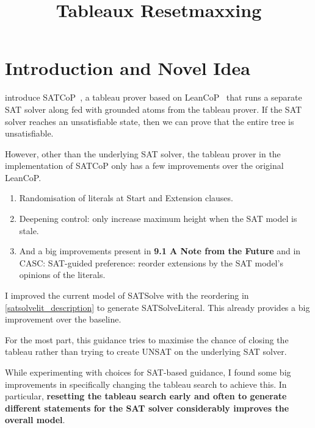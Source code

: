 \documentclass[11pt,twocolumn]{article}
\title{Tableaux Resetmaxxing}
\date{}
\author{}
\newcommand{\atom}[1]{\colorbox{Gray!30}{\ttfamily #1}}
\newcommand{\citen}[1]{~\parencite{#1}}
\begin{document}
\twocolumn[
	\centering
	\vspace{1em}
	{\LARGE\bfseries Tableau Resetmaxxing for Fun and Profit \par} \vspace{3pt}
	{\large (a crazy idea that works really well) \par}
	\vspace{2em}
]

\section{Introduction and Novel Idea}

\citeauthor{eliminatingModels} introduce SATCoP\citen{eliminatingModels}, a tableau prover based on LeanCoP\citen{Otten2023leanCoP20} that runs a separate SAT solver along fed with grounded atoms from the tableau prover.
If the SAT solver reaches an unsatisfiable state, then we can prove that the entire tree is unsatisfiable.

However, other than the underlying SAT solver, the tableau prover in the implementation of SATCoP only has a few improvements over the original LeanCoP.
\begin{enumerate}
	\item Randomisation of literals at \atom{Start} and \atom{Extension} clauses.
	\item Deepening control: only increase maximum height when the SAT model is stale.
	\item And a big improvements present in \textbf{9.1 A Note from the Future} and in CASC: SAT-guided preference: reorder extensions by the SAT model's opinions of the literals.
	\label{satsolvelit_description}
\end{enumerate}

I improved the current model of \atom{SATSolve} with the reordering in \cref{satsolvelit_description} to generate \atom{SATSolveLiteral}.
This already provides a big improvement over the baseline.

For the most part, this guidance tries to maximise the chance of closing the tableau rather than trying to create UNSAT on the underlying SAT solver.

While experimenting with choices for SAT-based guidance\cite{apr22_pres}, I found some big improvements in specifically changing the tableau search to achieve this.
In particular, \textbf{resetting the tableau search early and often to generate different statements for the SAT solver considerably improves the overall model}.
\end{document}
